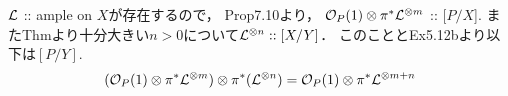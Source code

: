 \documentclass[a4paper]{jsarticle}
\begin{document}
    $\mathcal{L}$ :: ample on $X$が存在するので，
    Prop7.10より，
    $\mathcal{O}_P(1) \otimes \pi^* \mathcal{L}^{\otimes m}$ :: [$P/X$].
    またThmより十分大きい$n>0$について$\mathcal{L}^{\otimes n} :: [X/Y]$．
    このこととEx5.12bより以下は$[P/Y]$.
    \[
        (\mathcal{O}_P(1) \otimes \pi^* \mathcal{L}^{\otimes m}) \otimes \pi^*(\mathcal{L}^{\otimes n})
        =\mathcal{O}_P(1) \otimes \pi^* \mathcal{L}^{\otimes m+n}
    \]
\end{document}

